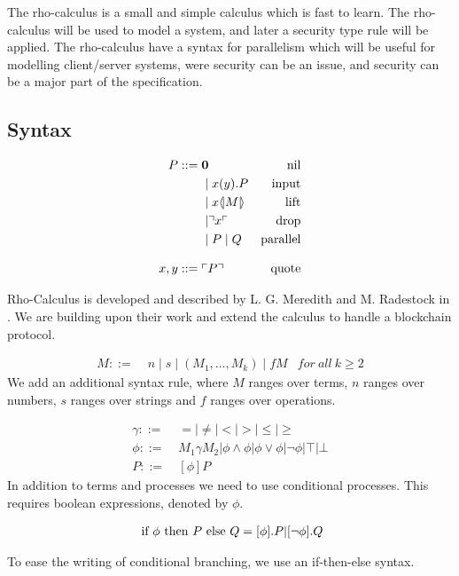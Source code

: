 The rho-calculus is a small and simple calculus which is fast to learn. The rho-calculus will be used to model a system, and later a security type rule will be applied. The rho-calculus have a syntax for parallelism which will be useful for modelling client/server systems, were security can be an issue, and security can be a major part of the specification. 

\subsection{Syntax}
\begin{align*}
    P  ::= \; &  \mathbf{0} & \text{nil} \\
      & \mid x(y).P & \text{input} \\
      & \mid x \langle \! | M | \! \rangle & \text{lift} \\
      & \mid \urcorner x \ulcorner & \text{drop} \\
      & \mid P \mid Q & \text{parallel} \\[3mm]
    x,y ::= \; & \ulcorner P \urcorner & \text{quote}\\
\end{align*}

Rho-Calculus is developed and described by L. G. Meredith and M. Radestock in \citep{Meredith2005}. We are building upon their work and extend the calculus to handle a blockchain protocol.

\begin{align*}
M::=\; & n \mid s \mid (M_1,...,M_k) \mid fM &for\ all\ k \geq 2
\end{align*}
We add an additional syntax rule, where $M$ ranges over terms, $n$ ranges over numbers, $s$ ranges over strings and $f$ ranges over operations.

\begin{align*}
\gamma ::=& \ =|\neq|<|>|\leq|\geq\\
\phi ::=& \ M_1\gamma M_2|\phi\land\phi|\phi\lor\phi|\neg\phi|\top|\bot\\
P::=& \ [\phi] P
\end{align*}
In addition to terms and processes we need to use conditional processes. This requires boolean expressions, denoted by \ensuremath{\phi}.

\begin{align*}
	\text{ if }\phi\text{ then }P\text{ else }Q = [\phi].P | [\neg \phi].Q
\end{align*}

To ease the writing of conditional branching, we use an if-then-else syntax.
